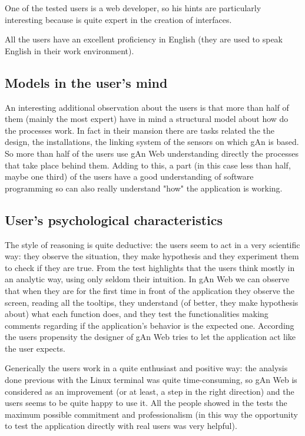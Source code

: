 One of the tested users is a web developer, so his hints are particularly interesting because is quite expert in the creation of interfaces.
 
All the users have an excellent proficiency in English (they are used to speak English in their work environment). 

\subsection{Models in the user's mind}
An interesting additional observation about the users is that more than half of them (mainly the most expert) have in mind a structural model about how do the processes work. In fact in their mansion there are tasks related the the design, the installations, the linking system of the sensors on which gAn is based. So more than half of the users use gAn Web understanding directly the processes that take place behind them. Adding to this, a part (in this case less than half, maybe one third) of the users have a good understanding of software programming so can also really understand "how" the application is working.

\subsection{User's psychological characteristics }
The style of reasoning is quite deductive: the users seem to act in a very scientific way: they observe the situation, they make hypothesis and they experiment them to check if they are true. From the test highlights that the users think mostly in an analytic way, using only seldom their intuition. In gAn Web we can observe that when they are for the first time in front of the application they observe the screen, reading all the tooltips, they understand (of better, they make hypothesis about) what each function does, and they test the functionalities making comments regarding if the application's behavior is the expected one. According the users propensity the designer of gAn Web tries to let the application act like the user expects.   

Generically the users work in a quite enthusiast and positive way: the analysis done previous with the Linux terminal was quite time-consuming, so gAn Web is considered as an improvement (or at least, a step in the right direction) and the users seems to be quite happy to use it. All the people showed in the tests the maximum possible commitment and professionalism (in this way the opportunity to test the application directly with real users was very helpful).

